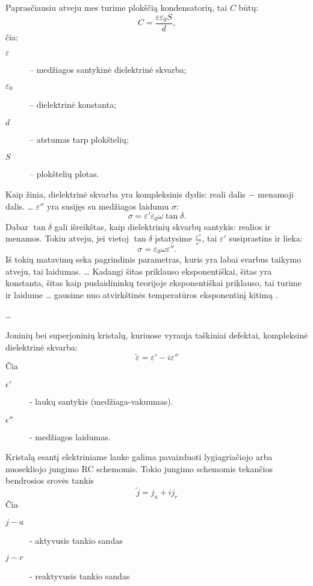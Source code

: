 Paprasčiausiu atveju mes turime plokščią kondensatorių, tai $C$ būtų:
\begin{equation*}
  C = \frac{\varepsilon \varepsilon_{0} S}{d},
\end{equation*}
čia:
\begin{description}
  \item[$\varepsilon$] – medžiagos santykinė dielektrinė skvarba;
  \item[$\varepsilon_{0}$] – dielektrinė konstanta;
  \item[$d$] – atstumas tarp plokštelių;
  \item[$S$] – plokštelių plotas.
\end{description}
Kaip žinia, dielektrinė skvarba yra kompleksinis dydis: reali dalis
$-$ menamoji dalis. … $\varepsilon''$ yra susijęs su medžiagos
laidumu $\sigma$:
\begin{equation*}
  \sigma = \varepsilon' \varepsilon_{0} \omega \tan \delta.
\end{equation*}
Dabar $\tan \delta$ gali išreikštas, kaip dielektrinių skvarbų santykis:
realios ir menamos. Tokiu atveju, jei vietoj $\tan \delta$ įstatysime
$\frac{\varepsilon''}{\varepsilon'}$, tai $\varepsilon'$ susiprastins
ir lieka:
\begin{equation*}
  \sigma = \varepsilon_{0} \omega \varepsilon''.
\end{equation*}
Iš tokių matavimų seka pagrindinis parametras, kuris yra labai
svarbus taikymo atveju, tai laidumas. … Kadangi šitas
priklauso eksponentiškai, šitas yra konstanta, šitas kaip puslaidininkų
teorijoje eksponentiškai priklauso, tai turime ir laidume …
gausime nuo atvirkštinės temperatūros eksponentinį kitimą .

… 

Joninių bei superjoninių kristalų, kuriuose vyrauja taškiniai
defektai, kompleksinė dielektrinė skvarba:
\begin{equation*}
  \tilde{\varepsilon} = \varepsilon' - i\varepsilon''
\end{equation*}
Čia
\begin{description}
 \item[$\epsilon'$]- laukų santykis (medžiaga-vakuumas).
 \item[$\epsilon''$] - medžiagos laidumas.
\end{description}

Kristalą esantį elektriniame lauke galima pavaizduoti lygiagriačiojo
arba nuosekliojo jungimo RC schemomis. Tokio jungimo schemomis
tekančios bendrosios srovės tankis
\begin{equation*}
  \tilde{j} = j_a + ij_r
\end{equation*}
Čia
\begin{description}
  \item[$j-a$] - aktyvusis tankio sandas
  \item[$j-r$] - reaktyvusis tankio sandas
\end{description}

